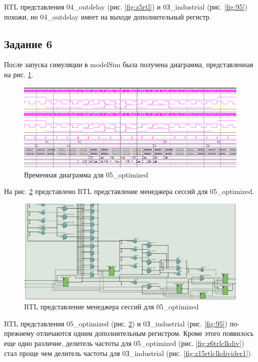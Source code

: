 \documentclass[a4paper,14pt]{article}
\begin{document}
	RTL представления 04\_outdelay (рис. \ref{fig:z5rtl}) и  0З\_industrial (рис. \ref{fig:95}) похожи, но 04\_outdelay имеет на выходе дополнительный регистр.
	
	\subsection{Задание 6}
	
	После запуска симуляции в modelSim была получена диаграмма, представленная на рис. \ref{fig:z6msimwvf}.
	
	\begin{figure}[H]
		\centering
		\includegraphics[width=0.9\linewidth]{images/z6_msim_wvf}
		\caption{Временная диаграмма для 05\_optimized}
		\label{fig:z6msimwvf}
	\end{figure}
	
	На рис. \ref{fig:z6rtl} представлено RTL представление менеджера сессий для 05\_optimized.
	
	\begin{figure}[H]
		\centering
		\includegraphics[width=0.9\linewidth]{images/z6_rtl}
		\caption{RTL представление менеджера сессий для 05\_optimized}
		\label{fig:z6rtl}
	\end{figure}
	
	RTL представления 05\_optimized (рис. \ref{fig:z6rtl}) и  0З\_industrial (рис. \ref{fig:95}) по-прежнему отличаются одним дополнительным регистром.
	Кроме этого появилось еще одно различие, делитель частоты для 05\_optimized (рис. \ref{fig:z6trlclkdiv}) стал проще чем делитель частоты для 0З\_industrial (рис. \ref{fig:z15rtlclkdivider1}).
	
\end{document}
